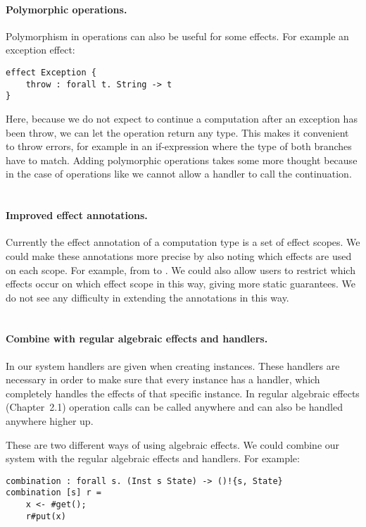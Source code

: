 \paragraph{Polymorphic operations.}
Polymorphism in operations can also be useful for some effects.
For example an exception effect:
\begin{verbatim}
effect Exception {
	throw : forall t. String -> t
}
\end{verbatim}
Here, because we do not expect to continue a computation after an exception has been throw, we can let the  operation return any type.
This makes it convenient to throw errors, for example in an if-expression where the type of both branches have to match.
Adding polymorphic operations takes some more thought because in the case of operations like  we cannot allow a handler to call the continuation.
\\\\
\paragraph{Improved effect annotations.}
Currently the effect annotation of a computation type is a set of effect scopes.
We could make these annotations more precise by also noting which effects are used on each scope.
For example, from  to .
We could also allow users to restrict which effects occur on which effect scope in this way, giving more static guarantees.
We do not see any difficulty in extending the annotations in this way.
\\\\
\paragraph{Combine with regular algebraic effects and handlers.}
In our system handlers are given when creating instances.
These handlers are necessary in order to make sure that every instance has a handler, which completely handles the effects of that specific instance.
In regular algebraic effects (Chapter~2.1) operation calls can be called anywhere and can also be handled anywhere higher up.

These are two different ways of using algebraic effects.
We could combine our system with the regular algebraic effects and handlers.
For example:
\begin{verbatim}
combination : forall s. (Inst s State) -> ()!{s, State}
combination [s] r =
	x <- #get();
	r#put(x)
\end{verbatim}

